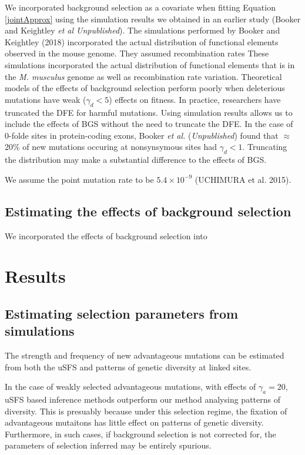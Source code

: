 \documentclass[11pt]{article}
\begin{document}
	
 	We incorporated background selection as a covariate when fitting Equation \ref{jointApprox} using the simulation results we obtained in an earlier study (Booker and Keightley \textit{et al Unpublished}). The simulations performed by Booker and Keightley (2018) incorporated the actual distribution of functional elements observed in the mouse genome. They assumed recombination rates 
 	These simulations incorporated the actual distribution of functional elements that is in the \textit{M. musculus} genome as well as recombination rate variation. Theoretical models of the effects of background selection perform poorly when deleterious mutations have weak ($\gamma_d < 5$) 	effects on fitness. In practice, researchers have truncated the DFE for harmful mutations. Using simulation results allows us to include the effects of BGS without the need to truncate the DFE. In the case of 0-folde sites in protein-coding exons, Booker \textit{et al.} (\textit{Unpublished}) found that $\approx$ 20\% of new mutations occuring at nonsynsymous sites had $\gamma_d < 1$. Truncating the distribution may make a substantial difference to the effects of BGS. 
 	
	We assume the point mutation rate to be $5.4 \times 10^{-9}$ (UCHIMURA et al. 2015).
 	
 	
\subsection*{Estimating the effects of background selection}

We incorporated the effects of background selection into 

\section*{Results}
\subsection*{Estimating selection parameters from simulations}

	The strength and frequency of new advantageous mutations can be  estimated from both the uSFS and patterns of genetic diversity at linked sites. 
	
	In the case of weakly selected advantageous mutations, with effects of $\gamma_a = 20$, uSFS based inference methods outperform our method analysing patterns of diversity. This is presuably because under this selection regime, the fixation of advantageous mutaitons has little effect on patterns of genetic diversity. Furthermore, in such cases, if background selection is not corrected for, the parameters of selection inferred may be entirely spurious.
	
\end{document}
